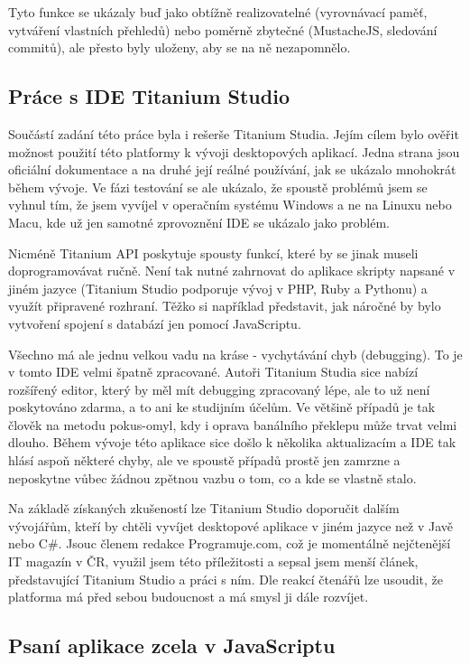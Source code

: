 Tyto funkce se ukázaly buď jako obtížně realizovatelné (vyrovnávací paměť, vytváření vlastních přehledů) nebo poměrně zbytečné (MustacheJS, sledování commitů), ale přesto byly uloženy, aby se na ně nezapomnělo.

\subsection{Práce s IDE Titanium Studio}

Součástí zadání této práce byla i rešerše Titanium Studia. Jejím cílem bylo ověřit možnost použití této platformy k vývoji desktopových aplikací. Jedna strana jsou oficiální dokumentace a na druhé její reálné používání, jak se ukázalo mnohokrát během vývoje. Ve fázi testování se ale ukázalo, že spoustě problémů jsem se vyhnul tím, že jsem vyvíjel v operačním systému Windows a ne na Linuxu nebo Macu, kde už jen samotné zprovoznění IDE se ukázalo jako problém.

Nicméně Titanium API poskytuje spousty funkcí, které by se jinak museli doprogramovávat ručně. Není tak nutné zahrnovat do aplikace skripty napsané v jiném jazyce (Titanium Studio podporuje vývoj v PHP, Ruby a Pythonu) a využít připravené rozhraní. Těžko si například představit, jak náročné by bylo vytvoření spojení s databází jen pomocí JavaScriptu.

Všechno má ale jednu velkou vadu na kráse - vychytávání chyb (debugging). To je v tomto IDE velmi špatně zpracované. Autoři Titanium Studia sice nabízí rozšířený editor, který by měl mít debugging zpracovaný lépe, ale to už není poskytováno zdarma, a to ani ke studijním účelům. Ve většině případů je tak člověk na metodu pokus-omyl, kdy i oprava banálního překlepu může trvat velmi dlouho. Během vývoje této aplikace sice došlo k několika aktualizacím a IDE tak hlásí aspoň některé chyby, ale ve spoustě případů prostě jen zamrzne a neposkytne vůbec žádnou zpětnou vazbu o tom, co a kde se vlastně stalo.

Na základě získaných zkušeností lze Titanium Studio doporučit dalším vývojářům, kteří by chtěli vyvíjet desktopové aplikace v jiném jazyce než v Javě nebo C\#. Jsouc členem redakce Programuje.com, což je momentálně nejčtenější IT magazín v ČR, využil jsem této příležitosti a sepsal jsem menší článek\cite{selfpromo}, představující Titanium Studio a práci s ním. Dle reakcí čtenářů lze usoudit, že platforma má před sebou budoucnost a má smysl ji dále rozvíjet.

\subsection{Psaní aplikace zcela v JavaScriptu}

